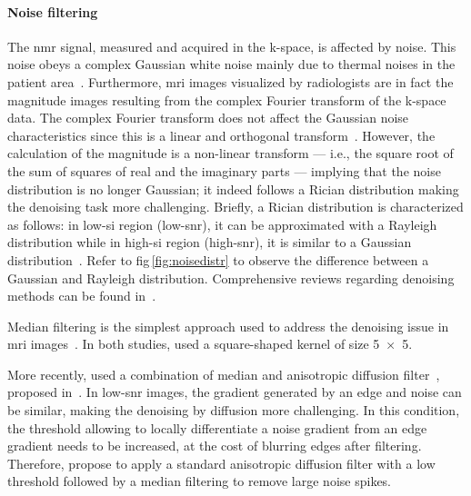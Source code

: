 \paragraph{Noise filtering} The \ac{nmr} signal, measured and acquired in the k-space, is affected by noise.
This noise obeys a complex Gaussian white noise mainly due to thermal noises in the patient area~\cite{Nowak1999}.
Furthermore, \ac{mri} images visualized by radiologists are in fact the magnitude images resulting from the complex Fourier transform of the k-space data.
The complex Fourier transform does not affect the Gaussian noise characteristics since this is a linear and orthogonal transform~\cite{Nowak1999}.
However, the calculation of the magnitude is a non-linear transform --- i.e., the square root of the sum of squares of real and the imaginary parts --- implying that the noise distribution is no longer Gaussian; it indeed follows a Rician distribution making the denoising task more challenging.
Briefly, a Rician distribution is characterized as follows: in low-\ac{si} region (low-\ac{snr}), it can be approximated with a Rayleigh distribution while in high-\ac{si} region (high-\ac{snr}), it is similar to a Gaussian distribution~\cite{Manjon2008}.
Refer to \acs{fig}\,\ref{fig:noisedistr} to observe the difference between a Gaussian and Rayleigh distribution.
Comprehensive reviews regarding denoising methods can be found in~\cite{Buades2005,Mohan2014}.

Median filtering is the simplest approach used to address the denoising issue in \ac{mri} images~\cite{Ozer2009,Ozer2010}.
In both studies, \citeauthor{Ozer2010} used a square-shaped kernel of size \SI[product-units=repeat]{5x5}{\px}.%

More recently, \citeauthor{rampun2016quantitative} used a combination of median and anisotropic diffusion filter~\cite{rampun2015classifying,rampun2016computer,rampun2016computerb,rampun2016quantitative}, proposed in~\cite{ling2002smoothing}.
In low-\ac{snr} images, the gradient generated by an edge and noise can be similar, making the denoising by diffusion more challenging.
In this condition, the threshold allowing to locally differentiate a noise gradient from an edge gradient needs to be increased, at the cost of blurring edges after filtering.
Therefore, \citeauthor{ling2002smoothing} propose to apply a standard anisotropic diffusion filter with a low threshold followed by a median filtering to remove large noise spikes.


